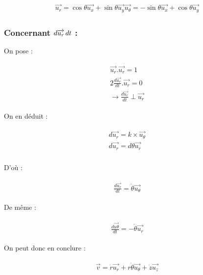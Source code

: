 \documentclass{article}
\begin{document}
\begin{align*}\begin{split}
\overrightarrow{u_r}=\cos\theta\overrightarrow{u_x}+\sin\theta\overrightarrow{u_y}
\overrightarrow{u_\theta}=-\sin\theta\overrightarrow{u_x}+\cos\theta\overrightarrow{u_y}
\end{split}\end{align*}


\subsubsection*{Concernant $d\overrightarrow{u_r}\,dt$ :}

On pose :

\begin{align*}\begin{split}
\overrightarrow{u_r}.\overrightarrow{u_r}=1\\
2\frac{d\overrightarrow{u_r}}{dt}.\overrightarrow{u_r}=0\\
\longrightarrow \frac{d\overrightarrow{u_r}}{dt}\perp\overrightarrow{u_r}
\end{split}\end{align*}

On en déduit :

\begin{align*}\begin{split}
d\overrightarrow{u_r}=k\times\overrightarrow{u_\theta}\\
d\overrightarrow{u_r}=d\theta\overrightarrow{u_r}\\
\end{split}\end{align*}

D'où :

\begin{align*}\begin{split}
\boxed{\frac{d\overrightarrow{u_r}}{dt}=\dot{\theta}\overrightarrow{u_\theta}}
\end{split}\end{align*}

De même :

\begin{align*}\begin{split}
\frac{d\overrightarrow{u\theta}}{dt}=-\dot{\theta}\overrightarrow{u_r}
\end{split}\end{align*}

On peut donc en conclure :

\begin{align*}\begin{split}
\boxed{\overrightarrow{v}=\dot{r}\overrightarrow{u_r}+r\dot{\theta}\overrightarrow{u_\theta}+\dot{z}\overrightarrow{u_z}}
\end{split}\end{align*}
\end{document}
